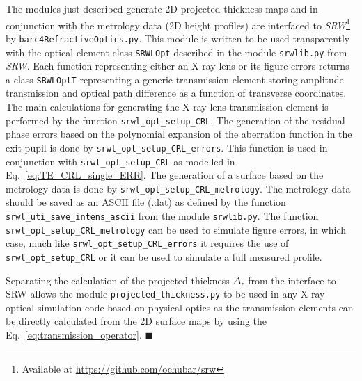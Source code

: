 \begin{refsection}
The modules just described generate 2D projected thickness maps and in conjunction with the metrology data (2D height profiles) are interfaced to \textit{SRW}\footnote{Available at \url{https://github.com/ochubar/srw}} by \texttt{barc4RefractiveOptics.py}. This module is written to be used transparently with the optical element class \texttt{SRWLOpt} described in the module \texttt{srwlib.py} from \textit{SRW}. Each function representing either an X-ray lens or its figure errors returns a class \texttt{SRWLOptT} representing a generic transmission element storing amplitude transmission and optical path difference as a function of transverse coordinates. The main calculations for generating the X-ray lens transmission element is performed by the function \texttt{srwl\_opt\_setup\_CRL}. The generation of the residual phase errors based on the polynomial expansion of the aberration function in the exit pupil is done by \texttt{srwl\_opt\_setup\_CRL\_errors}. This function is used in conjunction with \texttt{srwl\_opt\_setup\_CRL} as modelled in Eq.~\ref{eq:TE_CRL_single_ERR}. The generation of a surface based on the metrology data is done by \texttt{srwl\_opt\_setup\_CRL\_metrology}. The metrology data should be saved as an ASCII file (.dat) as defined by the function \texttt{srwl\_uti\_save\_intens\_ascii} from the module \texttt{srwlib.py}. The function \texttt{srwl\_opt\_setup\_CRL\_metrology} can be used to simulate figure errors, in which case, much like \texttt{srwl\_opt\_setup\_CRL\_errors} it requires the use of \texttt{srwl\_opt\_setup\_CRL} or it can be used to simulate a full measured profile. 

Separating the calculation of the projected thickness $\Delta_z$ from the interface to SRW allows the module \texttt{projected\_thickness.py} to be used in any X-ray optical simulation code based on physical optics as the transmission elements can be directly calculated from the 2D surface maps by using the Eq.~\ref{eq:transmission_operator}. $\blacksquare$


\printbibliography[heading=subbibliography]
\end{refsection}

